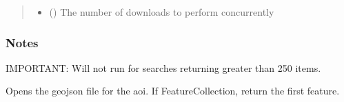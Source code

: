 \documentclass[letterpaper,10pt,english]{sphinxmanual}
\begin{document}
\begin{fulllineitems}
\begin{quote}
\begin{description}
\begin{itemize}
\item {} 
 () \textendash{} The number of downloads to perform concurrently

\end{itemize}

\end{description}\end{quote}
\subsubsection*{Notes}

IMPORTANT: Will not run for searches returning greater than 250 items.

\end{fulllineitems}


\begin{fulllineitems}
\label{\detokenize{index:pyeo.queries_and_downloads.read_aoi}}
Opens the geojson file for the aoi. If FeatureCollection, return the first feature.

\end{fulllineitems}

\end{document}

